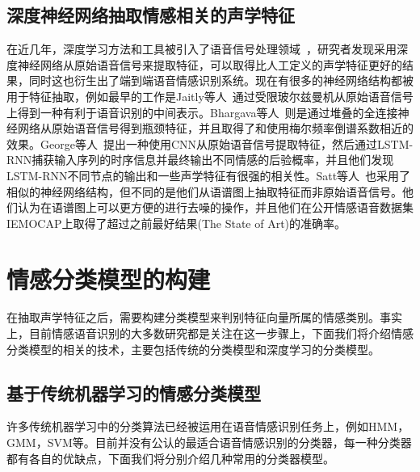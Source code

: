 \subsection{深度神经网络抽取情感相关的声学特征}
\label{ssec:dnn_extract}
在近几年，深度学习方法和工具被引入了语音信号处理领域~\cite{Han2014Speech, Lee2015High, Huang2014Speech, Le2013Emotion, Rana2016Emotion, Chernykh2017Emotion}，研究者发现采用深度神经网络从原始语音信号来提取特征，可以取得比人工定义的声学特征更好的结果，同时这也衍生出了端到端语音情感识别系统。现在有很多的神经网络结构都被用于特征抽取，例如最早的工作是Jaitly等人~\cite{Jaitly2011Learning}通过受限玻尔兹曼机从原始语音信号上得到一种有利于语音识别的中间表示。Bhargava等人~\cite{Bhargava2015Architectures}则是通过堆叠的全连接神经网络从原始语音信号得到瓶颈特征，并且取得了和使用梅尔频率倒谱系数相近的效果。George等人~\cite{Trigeorgis2016Adieu}提出一种使用CNN从原始语音信号提取特征，然后通过LSTM-RNN捕获输入序列的时序信息并最终输出不同情感的后验概率，并且他们发现LSTM-RNN不同节点的输出和一些声学特征有很强的相关性。Satt等人~\cite{Satt2017Efficient}也采用了相似的神经网络结构，但不同的是他们从语谱图上抽取特征而非原始语音信号。他们认为在语谱图上可以更方便的进行去噪的操作，并且他们在公开情感语音数据集IEMOCAP上取得了超过之前最好结果(The State of Art)的准确率。

\section{情感分类模型的构建}
\label{sec:emotion_cls}

在抽取声学特征之后，需要构建分类模型来判别特征向量所属的情感类别。事实上，目前情感语音识别的大多数研究都是关注在这一步骤上，下面我们将介绍情感分类模型的相关的技术，主要包括传统的分类模型和深度学习的分类模型。

\subsection{基于传统机器学习的情感分类模型}
\label{ssec:traditional_cls}

许多传统机器学习中的分类算法已经被运用在语音情感识别任务上，例如HMM，GMM，SVM等。目前并没有公认的最适合语音情感识别的分类器，每一种分类器都有各自的优缺点，下面我们将分别介绍几种常用的分类器模型。

